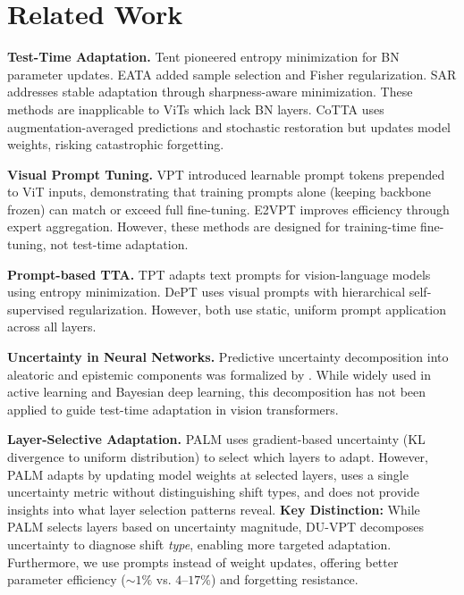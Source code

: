 \documentclass[11pt,a4paper]{article}
\begin{document}
\section{Related Work}

\textbf{Test-Time Adaptation.} Tent \citep{wang2021tent} pioneered entropy minimization for BN parameter updates. EATA \citep{niu2022eata} added sample selection and Fisher regularization. SAR \citep{niu2023towards} addresses stable adaptation through sharpness-aware minimization. These methods are inapplicable to ViTs which lack BN layers. CoTTA \citep{wang2022continual} uses augmentation-averaged predictions and stochastic restoration but updates model weights, risking catastrophic forgetting.

\textbf{Visual Prompt Tuning.} VPT \citep{jia2022visual} introduced learnable prompt tokens prepended to ViT inputs, demonstrating that training prompts alone (keeping backbone frozen) can match or exceed full fine-tuning. E2VPT \citep{han2023e2vpt} improves efficiency through expert aggregation. However, these methods are designed for training-time fine-tuning, not test-time adaptation.

\textbf{Prompt-based TTA.} TPT \citep{shu2022test} adapts text prompts for vision-language models using entropy minimization. DePT \citep{gao2022visual} uses visual prompts with hierarchical self-supervised regularization. However, both use static, uniform prompt application across all layers.

\textbf{Uncertainty in Neural Networks.} Predictive uncertainty decomposition into aleatoric and epistemic components was formalized by \citet{kendall2017uncertainties}. While widely used in active learning and Bayesian deep learning, this decomposition has not been applied to guide test-time adaptation in vision transformers.

\textbf{Layer-Selective Adaptation.} PALM \citep{maharana2025palm} uses gradient-based uncertainty (KL divergence to uniform distribution) to select which layers to adapt. However, PALM adapts by updating model weights at selected layers, uses a single uncertainty metric without distinguishing shift types, and does not provide insights into what layer selection patterns reveal. \textbf{Key Distinction:} While PALM selects layers based on uncertainty magnitude, DU-VPT decomposes uncertainty to diagnose shift \textit{type}, enabling more targeted adaptation. Furthermore, we use prompts instead of weight updates, offering better parameter efficiency (${\sim}1\%$ vs. $4$--$17\%$) and forgetting resistance.
\end{document}
